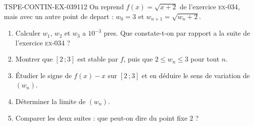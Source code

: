 \begin{exercice}{TSPE-CONTIN-EX-039}{1}{12}
On reprend $f(x) = \sqrt{x+2}$ de l'exercice \textsc{ex-034}, mais avec un autre point de depart : $w_0 = 3$ et $w_{n+1} = \sqrt{w_n + 2}$.
\begin{enumerate}
  \item Calculer $w_1$, $w_2$ et $w_3$ a $10^{-3}$ pres. Que constate-t-on par rapport a la suite de l'exercice \textsc{ex-034} ?
  \item Montrer que $[2\,;3]$ est stable par $f$, puis que $2 \leq w_n \leq 3$ pour tout $n$.
  \item Étudier le signe de $f(x) - x$ sur $[2\,;3]$ et en déduire le sens de variation de $(w_n)$.
  \item Déterminer la limite de $(w_n)$.
  \item Comparer les deux suites : que peut-on dire du point fixe $2$ ?
\end{enumerate}
\end{exercice}
